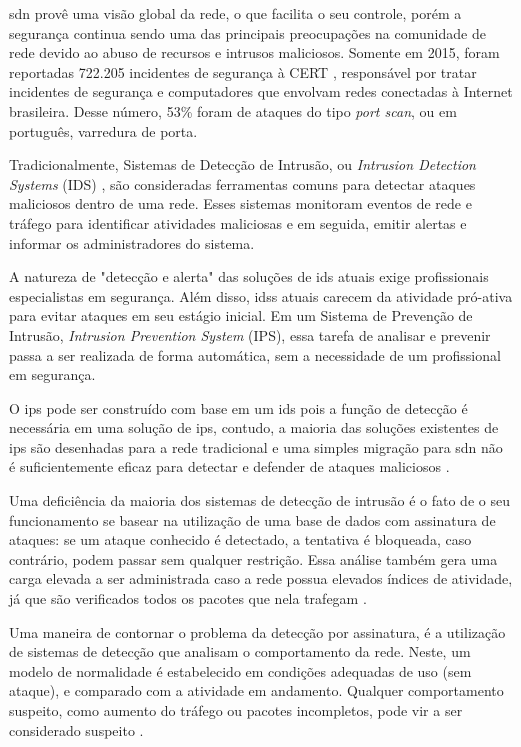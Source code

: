 \gls{sdn} provê uma visão global da rede, o que facilita o seu controle, porém a segurança continua sendo uma das principais preocupações na comunidade de rede devido ao abuso de recursos e intrusos maliciosos. Somente em 2015, foram reportadas 722.205 incidentes de segurança à CERT \cite{certbr}, responsável por tratar incidentes de segurança e computadores que envolvam redes conectadas à Internet brasileira. Desse número, 53\% foram de ataques do tipo \textit{port scan}, ou em português, varredura de porta.

Tradicionalmente, Sistemas de Detecção de Intrusão, ou \textit{Intrusion Detection Systems} (IDS) \cite{Comer:1988}, são consideradas ferramentas comuns para detectar ataques maliciosos dentro de uma rede. Esses sistemas monitoram eventos de rede e tráfego para identificar atividades maliciosas e em seguida, emitir alertas e informar os administradores do sistema. 

A natureza de "detecção e alerta" das soluções de \gls{ids} atuais exige profissionais especialistas em segurança. Além disso, \glspl{ids} atuais carecem da atividade pró-ativa para evitar ataques em seu estágio inicial. Em um Sistema de Prevenção de Intrusão, \textit{Intrusion Prevention System} (IPS), essa tarefa de analisar e prevenir passa a ser realizada de forma automática, sem a necessidade de um profissional em segurança.

O \gls{ips} pode ser construído com base em um \gls{ids} pois a função de detecção é necessária em uma solução de \gls{ips}, contudo, a maioria das soluções existentes de \gls{ips} são desenhadas para a rede tradicional e uma simples migração para \gls{sdn} não é suficientemente eficaz para detectar e defender de ataques maliciosos \cite{Xiong:2014}.

Uma deficiência da maioria dos sistemas de detecção de intrusão é o fato de o seu funcionamento se basear na utilização de uma base de dados com assinatura de ataques: se um ataque conhecido é detectado, a tentativa é bloqueada, caso contrário, podem passar sem qualquer restrição. Essa análise também gera uma carga elevada a ser administrada caso a rede possua elevados índices de atividade, já que são verificados todos os pacotes que nela trafegam \cite{unifoa:2007}.

Uma maneira de contornar o problema da detecção por assinatura, é a utilização de sistemas de detecção que analisam o comportamento da rede. Neste, um modelo de normalidade é estabelecido em condições adequadas de uso (sem ataque), e comparado com a atividade em andamento. Qualquer comportamento suspeito, como aumento do tráfego ou pacotes incompletos, pode vir a ser considerado suspeito  \cite{unifoa:2007}.

